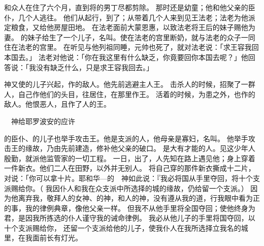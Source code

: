 {和{}众人在{}住了六个月，直到将{}的男丁尽都剪除。
那时{}还是幼童；他和他父亲的臣仆，几个{}人逃往{}。
他们从{}起行，到了{}；从{}带着几个人来到{}见{}王法老；法老为他派定粮食，又给他房屋田地。
在法老面前大蒙恩惠，以致法老将王后{}的妹子赐他为妻。
的妹子给{}生了一个儿子，名叫{}。{}使{}在法老的宫里断奶，{}就与法老的众子一同住在法老的宫里。
在{}听见{}与他列祖同睡，元帅{}也死了，就对法老说：「求王容我回本国去。」
法老对他说：「你在我这里有什么缺乏，你竟要回你本国去呢？」他回答说：「我没有缺乏什么，只是求王容我回去。」
\par }{\PP {}神又使{}的儿子{}兴起，作{}的敌人。他先前逃避主人{}王{}。
击杀{}人的时候，{}招聚了一群人，自己作他们的头目，往{}居住，在那里作王。
活着的时候，{}为患之外，{}也作{}的敌人。他恨恶{}人，且作了{}人的王。
\par }{\SH 　神给耶罗波安的应许
\par }{\PP {}的臣仆、{}的儿子{}也举手攻击王。他是{}支派的{}人，他母亲是寡妇，名叫{}。
他举手攻击王的缘故，乃由先前{}建造{}，修补他父亲{}的破口。
是大有才能的人。{}见这少年人殷勤，就派他监管{}家的一切工程。
一日，{}出了{}，{}人先知{}在路上遇见他；{}身上穿着一件新衣。他们二人在田野，以外并无别人。
将自己穿的那件新衣撕成十二片，
对{}说：「你可以拿十片。耶和华—{}的　神如此说：『我必将国从{}手里夺回，将十个支派赐给你。（
我因仆人{}和我在{}众支派中所选择的{}城的缘故，仍给{}留一个支派。）
因为他离弃我，敬拜{}人的女神{}、{}的神{}，和{}人的神{}，没有遵从我的道，行我眼中看为正的事，{}我的律例典章，像他父亲{}一样。
但我不从他手里将全国夺回；使他终身为君，是因我所拣选的仆人{}谨守我的诫命律例。
我必从他儿子的手里将国夺回，以十个支派赐给你，
还留一个支派给他的儿子，使我仆人{}在我所选择立我名的{}城里，在我面前长有灯光。
}
